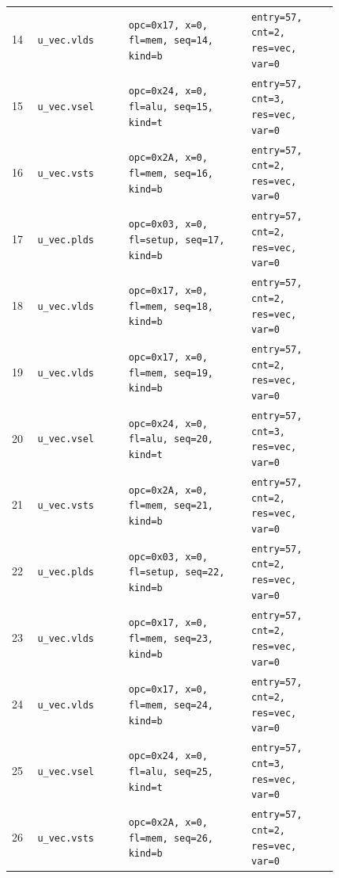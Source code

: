{\begin{longtable}{@{}R{0.055\linewidth}L{0.23\linewidth}L{0.31\linewidth}L{0.22\linewidth}@{}}
14 & \texttt{u\_vec.vlds} & \texttt{opc=0x17, x=0, fl=mem, seq=14, kind=b} & \texttt{entry=57, cnt=2, res=vec, var=0} \\
15 & \texttt{u\_vec.vsel} & \texttt{opc=0x24, x=0, fl=alu, seq=15, kind=t} & \texttt{entry=57, cnt=3, res=vec, var=0} \\
16 & \texttt{u\_vec.vsts} & \texttt{opc=0x2A, x=0, fl=mem, seq=16, kind=b} & \texttt{entry=57, cnt=2, res=vec, var=0} \\
17 & \texttt{u\_vec.plds} & \texttt{opc=0x03, x=0, fl=setup, seq=17, kind=b} & \texttt{entry=57, cnt=2, res=vec, var=0} \\
18 & \texttt{u\_vec.vlds} & \texttt{opc=0x17, x=0, fl=mem, seq=18, kind=b} & \texttt{entry=57, cnt=2, res=vec, var=0} \\
19 & \texttt{u\_vec.vlds} & \texttt{opc=0x17, x=0, fl=mem, seq=19, kind=b} & \texttt{entry=57, cnt=2, res=vec, var=0} \\
20 & \texttt{u\_vec.vsel} & \texttt{opc=0x24, x=0, fl=alu, seq=20, kind=t} & \texttt{entry=57, cnt=3, res=vec, var=0} \\
21 & \texttt{u\_vec.vsts} & \texttt{opc=0x2A, x=0, fl=mem, seq=21, kind=b} & \texttt{entry=57, cnt=2, res=vec, var=0} \\
22 & \texttt{u\_vec.plds} & \texttt{opc=0x03, x=0, fl=setup, seq=22, kind=b} & \texttt{entry=57, cnt=2, res=vec, var=0} \\
23 & \texttt{u\_vec.vlds} & \texttt{opc=0x17, x=0, fl=mem, seq=23, kind=b} & \texttt{entry=57, cnt=2, res=vec, var=0} \\
24 & \texttt{u\_vec.vlds} & \texttt{opc=0x17, x=0, fl=mem, seq=24, kind=b} & \texttt{entry=57, cnt=2, res=vec, var=0} \\
25 & \texttt{u\_vec.vsel} & \texttt{opc=0x24, x=0, fl=alu, seq=25, kind=t} & \texttt{entry=57, cnt=3, res=vec, var=0} \\
26 & \texttt{u\_vec.vsts} & \texttt{opc=0x2A, x=0, fl=mem, seq=26, kind=b} & \texttt{entry=57, cnt=2, res=vec, var=0} \\
\bottomrule
\end{longtable}
}
